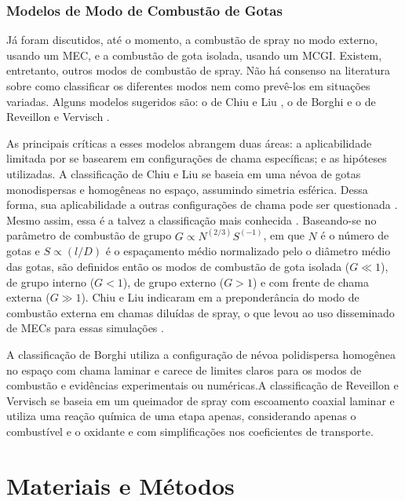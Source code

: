 \subsubsection{Modelos de Modo de Combustão de Gotas}
Já foram discutidos, até o momento, a combustão de spray no modo externo, usando um MEC, e a combustão de gota isolada, usando um MCGI.
Existem, entretanto, outros modos de combustão de spray.
Não há consenso na literatura sobre como classificar os diferentes modos nem como prevê-los em situações variadas.
Alguns modelos sugeridos são: o de Chiu e Liu \cite{ChiuH1977,ChiuH1982}, o de Borghi \cite{Borghi1996} e o de Reveillon e Vervisch \cite{ReveillonJ2005}.%

As principais críticas a esses modelos abrangem duas áreas: a aplicabilidade limitada por se basearem em configurações de chama específicas; e as hipóteses utilizadas. 
A classificação de Chiu e Liu \cite{ChiuH1977,ChiuH1982} se baseia em uma névoa de gotas monodispersas e homogêneas no espaço, assumindo simetria esférica.
Dessa forma, sua aplicabilidade a outras configurações de chama pode ser questionada \cite{SacomanoF2017PhD}.
Mesmo assim, essa é a talvez a classificação mais conhecida \cite{JennyB2012}.
Baseando-se no parâmetro de combustão de grupo $G\propto N^{(2/3)} S^{(-1)}$, em que $N$ é o número de gotas e $S\propto (l/D)$ é o espaçamento médio normalizado pelo o diâmetro médio das gotas, 
são definidos então os modos de combustão de gota isolada ($G\ll1$), de grupo interno ($G<1$), de grupo externo ($G>1$) e com frente de chama externa ($G\gg1$).
Chiu e Liu indicaram em \cite{ChiuH1982} a preponderância do modo de combustão externa em chamas diluídas de spray, o que levou ao uso disseminado de MECs para essas simulações \cite{SacomanoF2017PhD}.

A classificação de Borghi \cite{Borghi1996} utiliza a configuração de névoa polidispersa homogênea no espaço com chama laminar e carece de limites claros para os modos de combustão e evidências experimentais ou numéricas.A classificação de Reveillon e Vervisch  \cite{ReveillonJ2005} se baseia em um queimador de spray com escoamento coaxial laminar e utiliza uma reação química de uma etapa apenas, considerando apenas o combustível e o oxidante e com simplificações nos coeficientes de transporte.



\section{Materiais e Métodos} \label{sec:metod}

